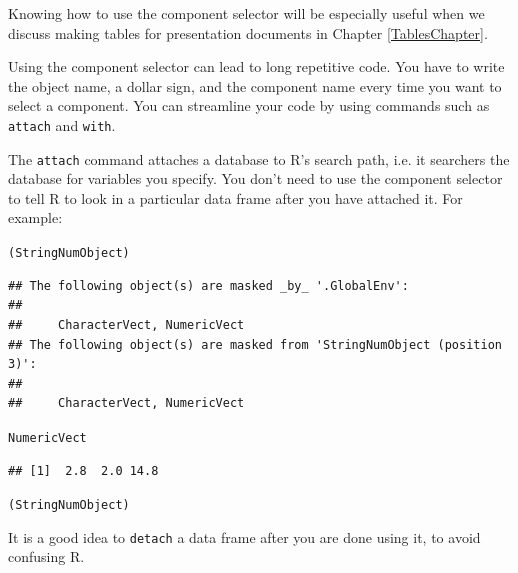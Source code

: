 \noindent Knowing how to use the component selector will be especially useful when we discuss making tables for presentation documents in Chapter \ref{TablesChapter}.

Using the component selector can lead to long repetitive code. You have to write the object name, a dollar sign, and the component name every time you want to select a component. You can streamline your code by using commands such as \texttt{attach} and \texttt{with}. 

The \texttt{attach} command attaches a database to R's search path, i.e. it searchers the database for variables you specify. You don't need to use the component selector to tell R to look in a particular data frame after you have attached it. For example:

\begin{knitrout}
\color{fgcolor}\begin{kframe}
\begin{alltt}
(StringNumObject)
\end{alltt}
\begin{verbatim}
## The following object(s) are masked _by_ '.GlobalEnv':
## 
##     CharacterVect, NumericVect
## The following object(s) are masked from 'StringNumObject (position 3)':
## 
##     CharacterVect, NumericVect
\end{verbatim}
\begin{alltt}

NumericVect
\end{alltt}
\begin{verbatim}
## [1]  2.8  2.0 14.8
\end{verbatim}
\begin{alltt}

(StringNumObject)
\end{alltt}
\end{kframe}
\end{knitrout}


\noindent It is a good idea to \texttt{detach} a data frame after you are done using it, to avoid confusing R. 

